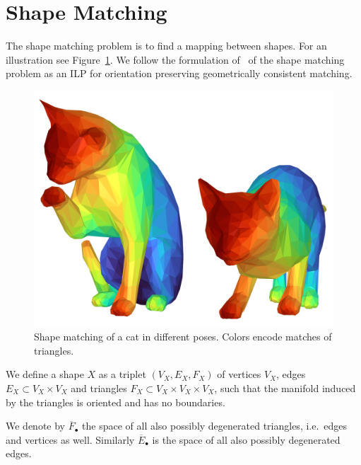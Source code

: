 \section{Shape Matching}
\label{sec:shape-matching}
The shape matching problem is to find a mapping between shapes.
For an illustration see Figure~\ref{fig:shape-matching}.
We follow the formulation of~\cite{windheuser2011geometrically,windheuser2011large} of the shape matching problem as an ILP for orientation preserving geometrically consistent matching.

\begin{figure}[h]
\centering
\includegraphics[width=0.8\columnwidth]{images/cat-matching}
\caption{Shape matching of a cat in different poses. Colors encode matches of triangles.}
\label{fig:shape-matching}
\end{figure}

\begin{definition}[Shape]
We define a shape $X$ as a triplet $(V_X, E_X,F_X)$ of vertices $V_X$, 
edges 
$E_X \subset V_X \times V_X$ 
and triangles 
$F_X \subset V_X \times V_X \times V_X$,
such that the manifold induced by the triangles is oriented and has no boundaries.

We denote by $\overline{F}_{\bullet}$ the space of all also possibly degenerated triangles, i.e.\ edges and vertices as well.
Similarly $\overline{E}_{\bullet}$ is the space of all also possibly degenerated edges.
\end{definition}

